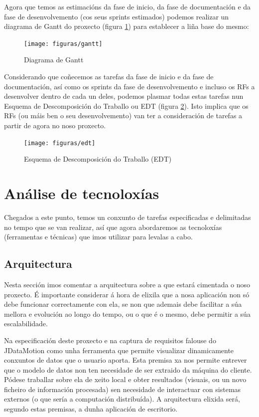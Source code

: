 Agora que temos as estimacións da fase de inicio, da fase de documentación e da fase de desenvolvemento (cos seus sprints estimados) podemos realizar un diagrama de Gantt do proxecto (figura \ref{gantt}) para establecer a liña base do mesmo:

\begin{figure}
\centering
\texttt{[image: figuras/gantt]}
\caption{Diagrama de Gantt}
\label{gantt}
\end{figure}

Considerando que coñecemos as tarefas da fase de inicio e da fase de documentación, así como os sprints da fase de desenvolvemento e incluso os RFs a desenvolver dentro de cada un deles, podemos plasmar todas estas tarefas nun Esquema de Descomposición do Traballo ou EDT (figura \ref{edt}). Isto implica que os RFs (ou máis ben o seu desenvolvemento) van ter a consideración de tarefas a partir de agora no noso proxecto.

\begin{figure}
\centering
\texttt{[image: figuras/edt]}
\caption{Esquema de Descomposición do Traballo (EDT)}
\label{edt}
\end{figure}

\chapter{Análise de tecnoloxías}

Chegados a este punto, temos un conxunto de tarefas especificadas e delimitadas no tempo que se van realizar, así que agora abordaremos as tecnoloxías (ferramentas e técnicas) que imos utilizar para levalas a cabo.

\section{Arquitectura}

Nesta sección imos comentar a arquitectura sobre a que estará cimentada o noso proxecto. É importante considerar á hora de elixila que a nosa aplicación non só debe funcionar correctamente con ela, se non que ademais debe facilitar a súa mellora e evolución ao longo do tempo, ou o que é o mesmo, debe permitir a súa escalabilidade.

Na especificación deste proxecto e na captura de requisitos falouse do JDataMotion como unha ferramenta que permite visualizar dinamicamente conxuntos de datos que o usuario aporta. Esta premisa xa nos permite entrever que o modelo de datos non ten necesidade de ser extraido da máquina do cliente. Pódese traballar sobre ela de xeito local e obter resultados (visuais, ou un novo ficheiro de información procesada) sen necesidade de interactuar con sistemas externos (o que sería a computación distribuída). A arquitectura elixida será, segundo estas premisas, a dunha aplicación de escritorio.

